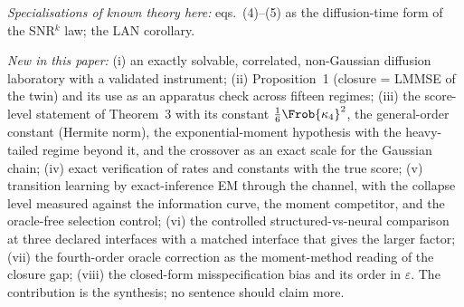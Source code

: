 \emph{Specialisations of known theory here:} eqs.~(4)--(5) as the diffusion-time form of the SNR$^k$ law; the LAN corollary.

\emph{New in this paper:} (i) an exactly solvable, correlated, non-Gaussian diffusion laboratory with a validated instrument; (ii) Proposition~1 (closure = LMMSE of the twin) and its use as an apparatus check across fifteen regimes; (iii) the score-level statement of Theorem~3 with its constant $\tfrac16\Frob{\kappa_4}^2$, the general-order constant (Hermite norm), the exponential-moment hypothesis with the heavy-tailed regime beyond it, and the crossover as an exact scale for the Gaussian chain; (iv) exact verification of rates and constants with the true score; (v) transition learning by exact-inference EM through the channel, with the collapse level measured against the information curve, the moment competitor, and the oracle-free selection control; (vi) the controlled structured-vs-neural comparison at three declared interfaces with a matched interface that gives the larger factor; (vii) the fourth-order oracle correction as the moment-method reading of the closure gap; (viii) the closed-form misspecification bias and its order in $\varepsilon$. The contribution is the synthesis; no sentence should claim more.

